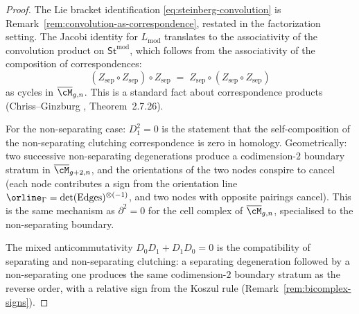\begin{proof}
The Lie bracket identification \eqref{eq:steinberg-convolution}
is Remark~\ref{rem:convolution-as-correspondence}, restated in
the factorization setting. The Jacobi identity for
$L_{\mathrm{mod}}$ translates to the associativity of the
convolution product on $\mathsf{St}^{\mathrm{mod}}$, which
follows from the associativity of the composition of
correspondences:
\[
 (Z_{\mathrm{sep}} \circ Z_{\mathrm{sep}}) \circ Z_{\mathrm{sep}}
 \;=\;
 Z_{\mathrm{sep}} \circ (Z_{\mathrm{sep}} \circ Z_{\mathrm{sep}})
\]
as cycles in $\Mbar_{g,n}$. This is a standard fact about
correspondence products (Chriss--Ginzburg \cite{CG97},
Theorem~2.7.26).

For the non-separating case: $D_1^2 = 0$ is the statement that
the self-composition of the non-separating clutching correspondence
is zero in homology. Geometrically: two successive non-separating
degenerations produce a codimension-$2$ boundary stratum in
$\Mbar_{g+2,n}$, and the orientations of the two nodes conspire
to cancel (each node contributes a sign from the orientation line
$\orline_\Gamma = \det(\mathrm{Edges})^{\otimes(-1)}$, and two
nodes with opposite pairings cancel). This is the same mechanism as
$\partial^2 = 0$ for the cell complex of $\Mbar_{g,n}$, specialised
to the non-separating boundary.

The mixed anticommutativity $D_0 D_1 + D_1 D_0 = 0$ is the
compatibility of separating and non-separating clutching: a
separating degeneration followed by a non-separating one produces
the same codimension-$2$ boundary stratum as the reverse order,
with a relative sign from the Koszul rule
(Remark~\ref{rem:bicomplex-signs}).
\end{proof}

